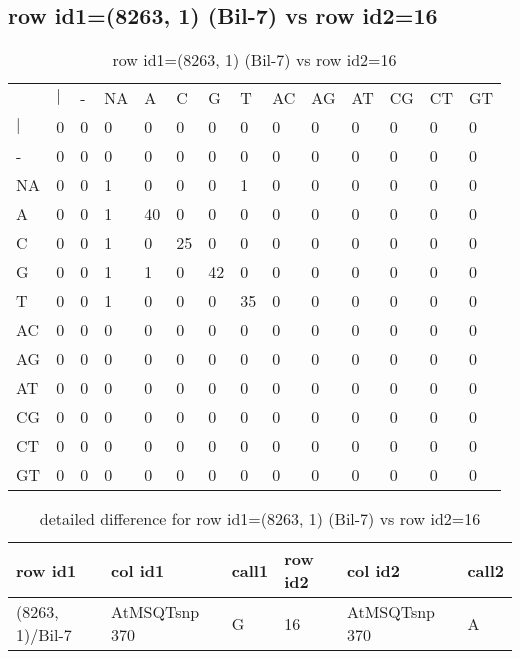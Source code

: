 \subsection{row id1=(8263, 1) (Bil-7) vs row id2=16}
\begin{center}
\begin{longtable}{|l|l|l|l|l|l|l|l|l|l|l|l|l|l|}
\caption{row id1=(8263, 1) (Bil-7) vs row id2=16} \label{table_dm408}\\
\hline
\\
\hline
&$|$&-&NA&A&C&G&T&AC&AG&AT&CG&CT&GT\\
$|$&0&0&0&0&0&0&0&0&0&0&0&0&0\\
-&0&0&0&0&0&0&0&0&0&0&0&0&0\\
NA&0&0&1&0&0&0&1&0&0&0&0&0&0\\
A&0&0&1&40&0&0&0&0&0&0&0&0&0\\
C&0&0&1&0&25&0&0&0&0&0&0&0&0\\
G&0&0&1&1&0&42&0&0&0&0&0&0&0\\
T&0&0&1&0&0&0&35&0&0&0&0&0&0\\
AC&0&0&0&0&0&0&0&0&0&0&0&0&0\\
AG&0&0&0&0&0&0&0&0&0&0&0&0&0\\
AT&0&0&0&0&0&0&0&0&0&0&0&0&0\\
CG&0&0&0&0&0&0&0&0&0&0&0&0&0\\
CT&0&0&0&0&0&0&0&0&0&0&0&0&0\\
GT&0&0&0&0&0&0&0&0&0&0&0&0&0\\
\hline
\end{longtable}
\end{center}

\begin{center}
\begin{longtable}{|l|l|l|l|l|l|}
\caption{detailed difference for row id1=(8263, 1) (Bil-7) vs row id2=16} \label{table_dm409}\\
\hline
row id1&col id1&call1&row id2&col id2&call2\\
\hline
(8263, 1)/Bil-7&AtMSQTsnp 370&G&16&AtMSQTsnp 370&A\\
\hline
\end{longtable}
\end{center}

